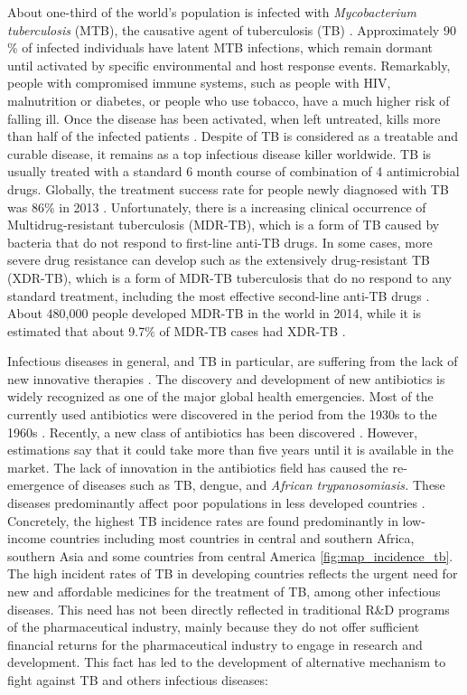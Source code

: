 \documentclass[12pt, b5paper,twoside]{tesi_upf}
\begin{document}
\par About one-third of the world's population is infected with \textit{Mycobacterium tuberculosis} (MTB), the causative agent of tuberculosis (TB) \cite{Lewandowski2015}. Approximately 90$\%$ of infected individuals have latent MTB infections, which remain dormant until activated by specific environmental and host response events. Remarkably, people with compromised immune systems, such as people with HIV, malnutrition or diabetes, or people who use tobacco, have a much higher risk of falling ill. Once the disease has been activated, when left untreated, kills more than half of the infected patients \cite{Connell2011}. Despite of TB is considered as a treatable and curable disease, it remains as a top infectious disease killer worldwide. TB is usually treated with a standard 6 month course of combination of 4 antimicrobial drugs. Globally, the treatment success rate for people newly diagnosed with TB was 86$\%$ in 2013 \cite{Lewandowski2015}. Unfortunately, there is a increasing clinical occurrence of Multidrug-resistant tuberculosis (MDR-TB), which is a form of TB caused by bacteria that do not respond to first-line anti-TB drugs. In some cases, more severe drug resistance can develop such as the extensively drug-resistant TB (XDR-TB), which is a form of MDR-TB tuberculosis that do no respond to any standard treatment, including the most effective second-line anti-TB drugs \cite{Berry2009}. About 480,000 people developed MDR-TB in the world in 2014, while it is estimated that about 9.7$\%$ of MDR-TB cases had XDR-TB \cite{Lewandowski2015}.

\par Infectious diseases in general, and TB in particular, are suffering from the lack of new innovative therapies \cite{Trouiller2016}. The discovery and development of new antibiotics is widely recognized as one of the major global health emergencies. Most of the currently used antibiotics were discovered in the period from the 1930s to the 1960s \cite{Conly2005}. Recently, a new class of antibiotics has been discovered \cite{Ling2015a}. However, estimations say that it could take more than five years until it is available in the market. The lack of innovation in the antibiotics field has caused the re-emergence of diseases such  as  TB, dengue, and \textit{African trypanosomiasis.} These diseases predominantly  affect  poor  populations in less developed countries \cite{Trouiller2016}. Concretely, the highest TB incidence rates are found predominantly in low-income countries including most countries in central and southern Africa, southern Asia and some countries from central America \ref{fig:map_incidence_tb}. The high incident rates of TB in developing countries reflects the urgent need for new and affordable medicines for the treatment of TB, among other infectious diseases. This need has not been directly reflected in traditional R$\&$D programs of the pharmaceutical industry, mainly because they do not offer sufficient financial returns for the pharmaceutical industry  to engage in research and development. This fact has led to the development of alternative mechanism to fight against TB and others infectious diseases:
\end{document}

